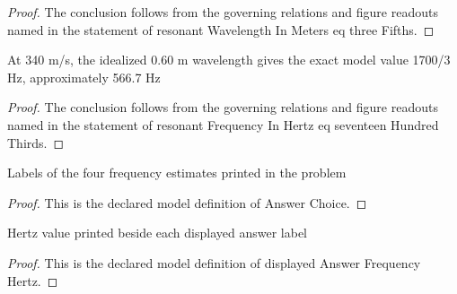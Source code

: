 \begin{proof}
  The conclusion follows from the governing relations and figure readouts named in the statement of resonant Wavelength In Meters eq three Fifths.
\end{proof}
\begin{lemma}
  \label{lem:physics:phyx-mini-0217:phyxminiproblems-problemphyxmini0217-resonantfrequencyinhertz-eq-seventeenhundredthirds}
  At 340 m/s, the idealized 0.60 m wavelength gives the exact model value 1700/3 Hz, approximately 566.7 Hz
\end{lemma}
\begin{proof}
  The conclusion follows from the governing relations and figure readouts named in the statement of resonant Frequency In Hertz eq seventeen Hundred Thirds.
\end{proof}
\begin{definition}
  \label{def:physics:phyx-mini-0217:phyxminiproblems-problemphyxmini0217-answerchoice}
  Labels of the four frequency estimates printed in the problem
\end{definition}
\begin{proof}
  This is the declared model definition of Answer Choice.
\end{proof}
\begin{definition}
  \label{def:physics:phyx-mini-0217:phyxminiproblems-problemphyxmini0217-displayedanswerfrequencyhertz}
  Hertz value printed beside each displayed answer label
\end{definition}
\begin{proof}
  This is the declared model definition of displayed Answer Frequency Hertz.
\end{proof}
